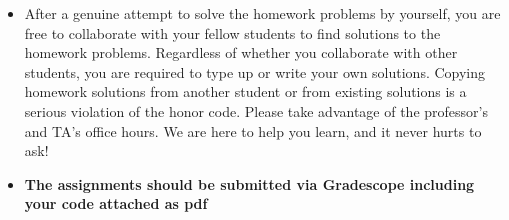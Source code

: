 

 \usepackage{hyperref}

\def\x{{\mathbf x}}
\def\L{{\cal L}}
\def\half{\frac{1}{2}}
\def\alphamax{\alpha_{\mbox{\tiny max}}}
\def\alphamin{\alpha_{\mbox{\tiny min}}}

\def\TVname{}

\def\alg{\mathcal{A}}
\def\R{\mathbb{R}}
\def\x{\mathbf{x}}
\def\y{\mathbf{y}}
\def\z{\mathbf{z}}
\def\p{\mathbf{p}}
\def\EE{\mathbb{E}}
\def\PP{\mathbb{P}}

\newtoggle{solution}
\toggletrue{solution} %







\begin{itemize}

\item After a genuine attempt to solve the homework problems by yourself, you are free to collaborate with your fellow students to find solutions to the homework problems. Regardless of whether you collaborate with other students, you are required to type up or write your own solutions. Copying homework solutions from another student or from existing solutions is a serious violation of the honor code. Please take advantage of  the professor's and TA's office hours. We are here to help you learn, and it never hurts to ask!
\item {\bf  The assignments should be submitted via Gradescope including your code attached as pdf}
\end{itemize}


